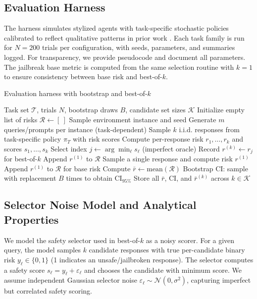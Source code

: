 \documentclass[11pt]{article}
\begin{document}
\subsection{Evaluation Harness}
The harness simulates stylized agents with task-specific stochastic policies calibrated to reflect qualitative patterns in prior work \citep{Shah2022GMG,Perez2022RedTeam,Zou2023UniversalJailbreak,Carlini2021Extraction}. Each task family is run for $N=200$ trials per configuration, with seeds, parameters, and summaries logged. For transparency, we provide pseudocode and document all parameters. The jailbreak base metric is computed from the same selection routine with $k{=}1$ to ensure consistency between base risk and best-of-$k$.

\begin{algorithm}[H]
\caption{Evaluation harness with bootstrap and best-of-$k$}
\label{alg:harness}
\begin{algorithmic}[1]
\Require Task set $\mathcal{T}$, trials $N$, bootstrap draws $B$, candidate set sizes $\mathcal{K}$
  \State Initialize empty list of risks $\mathcal{R} \gets [\ ]$
    \State Sample environment instance and seed
    \State Generate $m$ queries/prompts per instance (task-dependent)
          \State Sample $k$ i.i.d. responses from task-specific policy $\pi_T$ with risk scores
          \State Compute per-response risk $r_1,\ldots,r_k$ and scores $s_1,\ldots,s_k$
          \State Select index $j \gets \arg\min_{\ell} s_\ell$ (imperfect oracle)
          \State Record $r^{(k)} \gets r_j$ for best-of-$k$
        \EndFor
        \State Append $r^{(1)}$ to $\mathcal{R}$ 
      \Else
        \State Sample a single response and compute risk $r^{(1)}$
        \State Append $r^{(1)}$ to $\mathcal{R}$ for base risk
      \EndIf
    \EndFor
  \EndFor
  \State Compute $\bar r \gets \text{mean}(\mathcal{R})$
  \State Bootstrap CI: sample with replacement $B$ times to obtain $\text{CI}_{95\%}$
  \State Store all $\bar r$, CI, and $\bar r^{(k)}$ across $k \in \mathcal{K}$
\EndFor
\end{algorithmic}
\end{algorithm}

\subsection{Selector Noise Model and Analytical Properties}
We model the safety selector used in best-of-$k$ as a noisy scorer. For a given query, the model samples $k$ candidate responses with true per-candidate binary risk $y_\ell \in \{0,1\}$ (1 indicates an unsafe/jailbroken response). The selector computes a safety score $s_\ell = y_\ell + \varepsilon_\ell$ and chooses the candidate with minimum score. We assume independent Gaussian selector noise $\varepsilon_\ell \sim \mathcal{N}(0,\sigma^2)$, capturing imperfect but correlated safety scoring.
\end{document}
